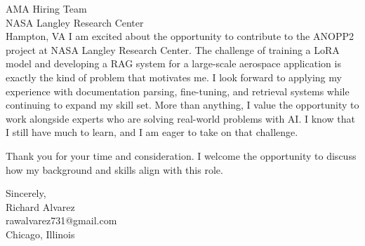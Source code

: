 \documentclass[a4paper,10pt]{letter}
\begin{document}
\begin{letter}{AMA Hiring Team \\
NASA Langley Research Center \\
Hampton, VA}
I am excited about the opportunity to contribute to the ANOPP2 project at NASA Langley Research Center. The challenge of training a LoRA model and developing a RAG system for a large-scale aerospace application is exactly the kind of problem that motivates me. I look forward to applying my experience with documentation parsing, fine-tuning, and retrieval systems while continuing to expand my skill set. More than anything, I value the opportunity to work alongside experts who are solving real-world problems with AI. I know that I still have much to learn, and I am eager to take on that challenge.

Thank you for your time and consideration. I welcome the opportunity to discuss how my background and skills align with this role.

Sincerely, \\
Richard Alvarez \\
rawalvarez731@gmail.com \\
Chicago, Illinois

\end{letter}
\end{document}
